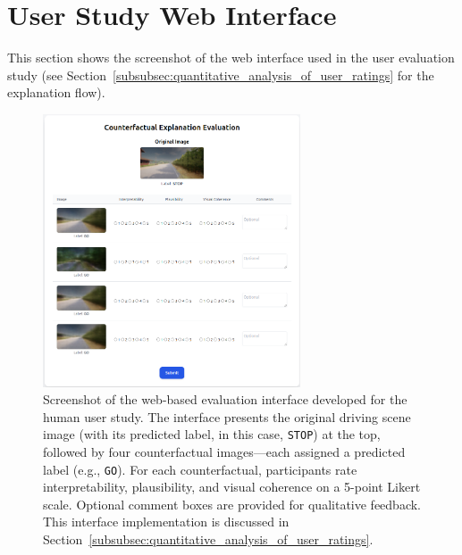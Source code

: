 \clearpage
\section*{User Study Web Interface} \label{app:web_interface}

\vspace{-0.75em}
\noindent
This section shows the screenshot of the web interface used in the user evaluation study (see Section~\ref{subsubsec:quantitative_analysis_of_user_ratings} for the explanation flow).

\vspace{-0.5em}

\begin{figure}[h]
    \centering
    \captionsetup{font=small,skip=4pt}
    \includegraphics[width=0.68\textwidth]{img/web_app_screenshots/grading.png}
    \caption{Screenshot of the web-based evaluation interface developed for the human user study. The interface presents the original driving scene image (with its predicted label, in this case, \texttt{STOP}) at the top, followed by four counterfactual images—each assigned a predicted label (e.g., \texttt{GO}). For each counterfactual, participants rate interpretability, plausibility, and visual coherence on a 5-point Likert scale. Optional comment boxes are provided for qualitative feedback. This interface implementation is discussed in Section~\ref{subsubsec:quantitative_analysis_of_user_ratings}.}
    \label{fig:app:grading}
\end{figure}


